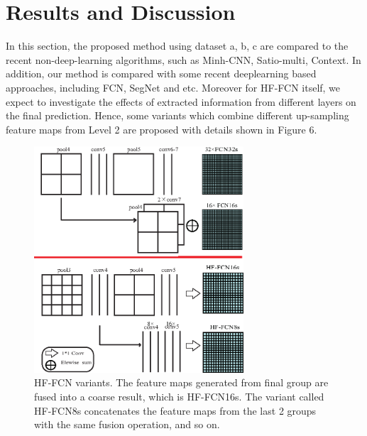 \section{Results and Discussion}
\label{Sec:Res}
In this section, the proposed method using dataset a, b, c are compared to the recent non-deep-learning algorithms, such as Minh-CNN\cite{IEEEexample:mnih2013machine}, Satio-multi\cite{IEEEexample:saito2016multiple}, Context\cite{IEEEexample:audebert2017deep}. In addition, our method is compared with some recent deeplearning based approaches, including FCN\cite{IEEEexample:Long_2015_CVPR}, SegNet\cite{IEEEexample:badrinarayanan2017segnet} and etc. Moreover for HF-FCN itself, we expect to investigate the effects of extracted information from different layers on the final prediction. Hence, some variants which combine different up-sampling feature maps from Level 2 are proposed with details shown in Figure 6.\par

\begin{figure}[t]
\begin{center}
\includegraphics[width=7.8cm]{Figures/vairants.eps}
\caption{HF-FCN variants. The feature maps generated from final group are fused into a coarse result, which is HF-FCN16s. The variant called HF-FCN8s concatenates the feature maps from the last 2 groups with the same fusion operation, and so on.}
\label{6}
\end{center}
\end{figure}


